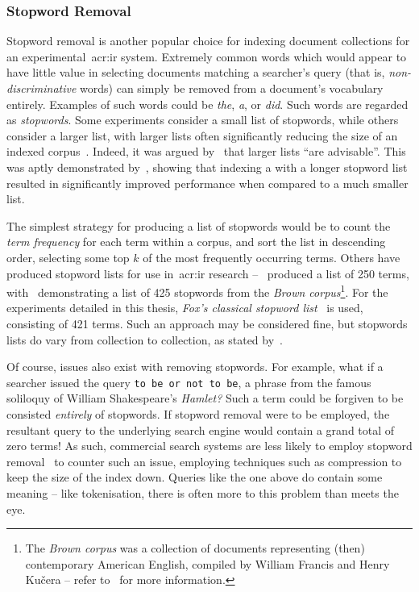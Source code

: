 \subsubsection{Stopword Removal}\label{sec:ir_background:basics:indexing:stopwords}
Stopword removal is another popular choice for indexing document collections for an experimental~\gls{acr:ir} system. Extremely common words which would appear to have little value in selecting documents matching a searcher's query (that is, \emph{non-discriminative} words) can simply be removed from a document's vocabulary entirely. Examples of such words could be \emph{the}, \emph{a}, or \emph{did}. Such words are regarded as \emph{stopwords}. Some experiments consider a small list of stopwords, while others consider a larger list, with larger lists often significantly reducing the size of an indexed corpus~\citep{manning2008ir}. Indeed, it was argued by~\cite{fox1992stopwords} that larger lists ``are advisable''. This was aptly demonstrated by~\cite{dolamic2010stopword}, showing that indexing a with a longer stopword list resulted in significantly improved performance when compared to a much smaller list.

The simplest strategy for producing a list of stopwords would be to count the \emph{term frequency} for each term within a corpus, and sort the list in descending order, selecting some top $k$ of the most frequently occurring terms. Others have produced stopword lists for use in~\gls{acr:ir} research --~\cite{rijsbergen1979ir} produced a list of 250 terms, with~\cite{francis1985stopwords} demonstrating a list of 425 stopwords from the \emph{Brown corpus}\footnote{The \emph{Brown corpus} was a collection of documents representing (then) contemporary American English, compiled by William Francis and Henry Ku\v{c}era -- refer to~\cite{francis1979brown_manual} for more information.}. For the experiments detailed in this thesis, \emph{Fox's classical stopword list}~\citep{fox1992stopwords} is used, consisting of 421 terms. Such an approach may be considered fine, but stopwords lists do vary from collection to collection, as stated by~\cite{lo2005automatically}.

Of course, issues also exist with removing stopwords. For example, what if a searcher issued the query \texttt{to be or not to be}, a phrase from the famous soliloquy of William Shakespeare's \emph{Hamlet?} Such a term could be forgiven to be consisted \emph{entirely} of stopwords. If stopword removal were to be employed, the resultant query to the underlying search engine would contain a grand total of zero terms! As such, commercial search systems are less likely to employ stopword removal~\citep{manning2008ir, dolamic2010stopword} to counter such an issue, employing techniques such as compression to keep the size of the index down. Queries like the one above do contain some meaning -- like tokenisation, there is often more to this problem than meets the eye.

